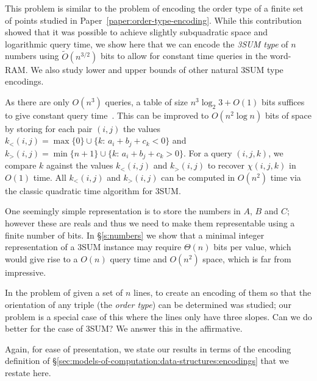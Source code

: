 This problem is similar to the problem of encoding the order
type of a finite set of points studied in Paper~\ref{paper:order-type-encoding}.
While this contribution showed that it was
possible to achieve slightly subquadratic space and logarithmic query time, we
show here that we can encode the \emph{3SUM type} of \(n\) numbers using
\(\tilde{O}(n^{3/2})\) bits to allow for constant time queries in the
word-RAM.
%
We also study lower and upper bounds of other natural 3SUM type encodings.

As there are only $O(n^3)$ queries, a table
of size $n^3 \log_2 3 + O(1)$ bits suffices to give constant query time~\cite{DPT10}.
%
This can be improved to $O(n^2\log n)$ bits of space by
storing for each pair $(i,j)$ the values
\(k_<(i,j) = \max \{ 0\}\cup \{k \colon\, a_i + b_j + c_k < 0\}\) and
\(k_>(i,j) = \min \{ n+1\}\cup \{k \colon\, a_i + b_j + c_k > 0\}\).
For a query \((i,j,k)\), we compare \(k\) against the values \(k_<(i,j)\) and \(k_>(i,j)\)
to recover \(\chi(i,j,k)\) in \(O(1)\) time. All \(k_<(i,j)\) and \(k_>(i,j)\)
can be computed in \(O(n^2)\) time via the classic quadratic time algorithm for
3SUM.

One seemingly simple representation is to store the numbers in $A$, $B$ and
$C$; however these are reals and thus we need to make them representable using
a finite number of bits.
In \S\ref{s:numbers} we show that a minimal integer representation of a
3SUM instance may require $\Theta(n)$ bits per value, which would give
rise to a $O(n)$ query time and $O(n^2)$ space, which is far from
impressive.
%


In \cite{CCILO19} the problem of given a set of $n$ lines, to create an
encoding of them so that the orientation of any triple (the \emph{order type})
can be determined was studied; our problem is a special case of this where the
lines only have three slopes.
Can we do better for the case of 3SUM? We answer this in the affirmative.

Again, for ease of presentation, we state our results in terms of the encoding
definition of \S\ref{sec:models-of-computation:data-structures:encodings} that
we restate here.
%
\DefinitionEncoding*

